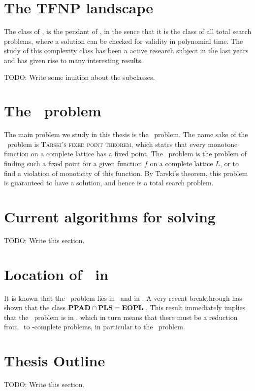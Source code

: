 \section{The TFNP landscape}

The class of \TFNP, is the pendant of \NP, in the sence that it is the class of all total search problems, where a solution can be checked for validity in polynomial time. The study of this complexity class has been a active research subject in the last years and has given rise to many interesting results.

TODO: Write some inuition about the subclasses.

\section{The \Tarski\ problem}

The main problem we study in this thesis is the \Tarski\ problem. The name sake of the \Tarski\ problem is \textsc{Tarski's fixed point theorem}, which states that every monotone function on a complete lattice has a fixed point. The \Tarski\ problem is the problem of finding such a fixed point for a given function $f$ on a complete lattice $L$, or to find a violation of monoticity of this function. By Tarski's theorem, this problem is guaranteed to have a solution, and hence is a total search problem.

\section{Current algorithms for solving \Tarski}

TODO: Write this section.

\section{Location of \Tarski\ in \TFNP}
It is known that the \Tarski\ problem lies in \PPAD\ and in \PLS. A very recent breakthrough has shown that the class $\textbf{PPAD} \cap \textbf{PLS} = \textbf{EOPL}$ . This result immediately implies that the \Tarski\ problem is in \EOPL, which in turn means that there must be a reduction from \Tarski\ to \EOPL-complete problems, in particular to the \EndOfPotentialLine\ problem.

\section{Thesis Outline}

TODO: Write this section.